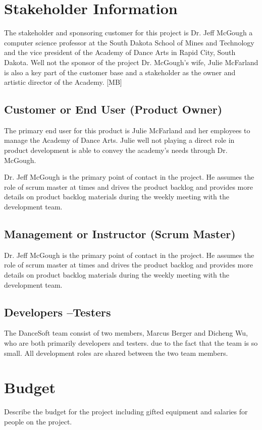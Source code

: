 \section{Stakeholder Information}

The stakeholder and sponsoring customer for this project is Dr. Jeff McGough a computer science professor at the South Dakota School of Mines and Technology and the vice president of the Academy of Dance Arts in Rapid City, South Dakota.
Well not the sponsor of the project Dr. McGough's wife, Julie McFarland is also a key part of the customer base and a stakeholder as the owner and artistic director of the Academy. [MB] 


\subsection{Customer or End User (Product Owner)}
The primary end user for this product is Julie McFarland and her employees to manage the Academy of Dance Arts. Julie well not playing a direct role in product development is able to convey the academy's needs through Dr. McGough.

Dr. Jeff McGough is the primary point of contact in the project. He assumes the role of scrum master at times and drives the product backlog and provides more details on product backlog materials during the weekly meeting with the development team. 

\subsection{Management or Instructor (Scrum Master)}
Dr. Jeff McGough is the primary point of contact in the project. He assumes the role of scrum master at times and drives the product backlog and provides more details on product backlog materials during the weekly meeting with the development team.


\subsection{Developers --Testers}
The DanceSoft team consist of two members, Marcus Berger and Dicheng Wu, who are both primarily developers and testers. due to the fact that the team is so small. All development roles are shared between the two team members.


\section{Budget}
Describe the budget for the project including gifted equipment and salaries for 
people on the project.

